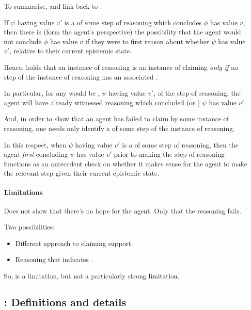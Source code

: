 \begin{note}[Summary]
  To summarise, and link back to \ideaCS{}:

  If \(\psi\) having value \(v'\) is a \requ{} of some step of reasoning which concludes \(\phi\) has value \(v\), then there is (form the agent's perspective) the possibility that the agent would not conclude \(\phi\) has value \(v\) if they were to first reason about whether \(\psi\) has value \(v'\), relative to their current epistemic state.

  Hence, \ideaCS{} holds that an instance of reasoning is an instance of claiming \support{} \emph{only if} no step of the instance of reasoning has an associated \requ{}.

  In particular, for any would be \requ{}, \(\psi\) having value \(v'\), of the step of reasoning, the agent will have already witnessed reasoning which concluded (or \indicateVed{}) \(\psi\) has value \(v'\).

  And, in order to show that an agent has failed to claim \support{} by some instance of reasoning, one needs only identify a \requ{} of some step of the instance of reasoning.

  In this respect, when \(\psi\) having value \(v'\) is a \requ{} of some step of reasoning, then the agent \emph{first} concluding \(\psi\) has value \(v'\) prior to making the step of reasoning functions as an antecedent check on whether it makes sense for the agent to make the relevant step given their current epistemic state.
\end{note}

\paragraph{Limitations}

\begin{note}
  Does not show that there's no hope for the agent.
  Only that the reasoning fails.

  Two possibilities:
  \begin{itemize}
  \item Different approach to claiming support.
  \item Reasoning that indicates \crequ{}.
  \end{itemize}

  So, \ideaCS{} is a limitation, but not a particularly strong limitation.
\end{note}

\subsection{: Definitions and details}
\label{sec:requ3}
\label{sec:ideaCS:requ:details}


